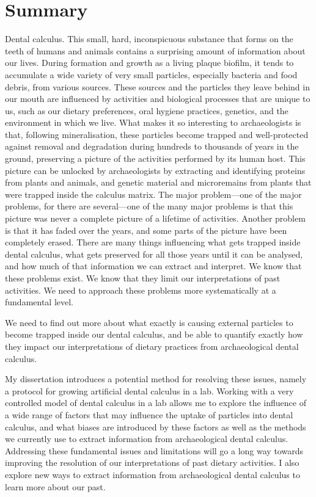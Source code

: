 \documentclass[
  b5paper,
]{book}
\begin{document}
\label{summary-6}

\chapter*{Summary}


Dental calculus. This small, hard, inconspicuous substance that forms on
the teeth of humans and animals contains a surprising amount of
information about our lives. During formation and growth as a living
plaque biofilm, it tends to accumulate a wide variety of very small
particles, especially bacteria and food debris, from various sources.
These sources and the particles they leave behind in our mouth are
influenced by activities and biological processes that are unique to us,
such as our dietary preferences, oral hygiene practices, genetics, and
the environment in which we live. What makes it so interesting to
archaeologists is that, following mineralisation, these particles become
trapped and well-protected against removal and degradation during
hundreds to thousands of years in the ground, preserving a picture of
the activities performed by its human host. This picture can be unlocked
by archaeologists by extracting and identifying proteins from plants and
animals, and genetic material and microremains from plants that were
trapped inside the calculus matrix. The major problem---one of the major
problems, for there are several---one of the many major problems is that
this picture was never a complete picture of a lifetime of activities.
Another problem is that it has faded over the years, and some parts of
the picture have been completely erased. There are many things
influencing what gets trapped inside dental calculus, what gets
preserved for all those years until it can be analysed, and how much of
that information we can extract and interpret. We know that these
problems exist. We know that they limit our interpretations of past
activities. We need to approach these problems more systematically at a
fundamental level.

We need to find out more about what exactly is causing external
particles to become trapped inside our dental calculus, and be able to
quantify exactly how they impact our interpretations of dietary
practices from archaeological dental calculus.

My dissertation introduces a potential method for resolving these
issues, namely a protocol for growing artificial dental calculus in a
lab. Working with a very controlled model of dental calculus in a lab
allows me to explore the influence of a wide range of factors that may
influence the uptake of particles into dental calculus, and what biases
are introduced by these factors as well as the methods we currently use
to extract information from archaeological dental calculus. Addressing
these fundamental issues and limitations will go a long way towards
improving the resolution of our interpretations of past dietary
activities. I also explore new ways to extract information from
archaeological dental calculus to learn more about our past.
\end{document}
